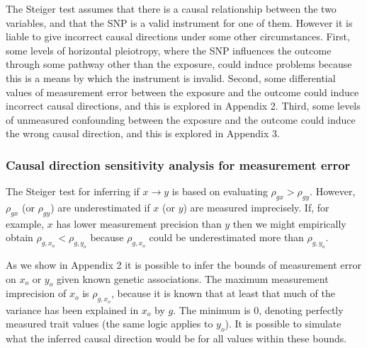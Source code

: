 \documentclass[]{article}
\begin{document}
The Steiger test assumes that there is a causal relationship between the
two variables, and that the SNP is a valid instrument for one of them.
However it is liable to give incorrect causal directions under some
other circumstances. First, some levels of horizontal pleiotropy, where
the SNP influences the outcome through some pathway other than the
exposure, could induce problems because this is a means by which the
instrument is invalid. Second, some differential values of measurement
error between the exposure and the outcome could induce incorrect causal
directions, and this is explored in Appendix 2. Third, some levels of
unmeasured confounding between the exposure and the outcome could induce
the wrong causal direction, and this is explored in Appendix 3.

\subsubsection{Causal direction sensitivity analysis for measurement
error}\label{causal-direction-sensitivity-analysis-for-measurement-error}

The Steiger test for inferring if \(x \rightarrow y\) is based on
evaluating \(\rho_{gx} > \rho_{gy}\). However, \(\rho_{gx}\) (or
\(\rho_{gy}\)) are underestimated if \(x\) (or \(y\)) are measured
imprecisely. If, for example, \(x\) has lower measurement precision than
\(y\) then we might empirically obtain \(\rho_{g,x_o} < \rho_{g,y_o}\)
because \(\rho_{g,x_o}\) could be underestimated more than
\(\rho_{g,y_o}\).

As we show in Appendix 2 it is possible to infer the bounds of
measurement error on \(x_o\) or \(y_o\) given known genetic
associations. The maximum measurement imprecision of \(x_o\) is
\(\rho_{g,x_o}\), because it is known that at least that much of the
variance has been explained in \(x_o\) by \(g\). The minimum is 0,
denoting perfectly measured trait values (the same logic applies to
\(y_o\)). It is possible to simulate what the inferred causal direction
would be for all values within these bounds.
\end{document}
